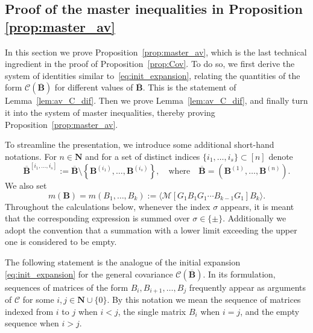 \documentclass[10pt]{amsart}
\numberwithin{equation}{section}
\newcommand{\N}{\mathbf{N}}
\begin{document}
\subsection{Proof of the master inequalities in Proposition \ref{prop:master_av}}\label{subsec:master_proof}

In this section we prove Proposition~\ref{prop:master_av}, which is the last technical ingredient in the proof of Proposition~\ref{prop:Cov}. To do so, we first derive the system of identities similar to~\eqref{eq:init_expansion}, relating the quantities of the form $\mathcal{C}(\overline{\bm{B}})$ for different values of $\overline{\bm{B}}$. This is the statement of Lemma~\ref{lem:av_C_dif}. Then we prove Lemma~\ref{lem:av_C_dif}, and finally turn it into the system of master inequalities, thereby proving Proposition~\ref{prop:master_av}.

To streamline the presentation, we introduce some additional short-hand notations. For $n\in\N$ and for a set of distinct indices $\{i_1,\ldots,i_s\}\subset [n]$ denote
\begin{equation*}
\overline{\bm{B}}^{[i_1,\ldots,i_s]}:=\overline{\bm{B}}\setminus\left\lbrace\bm{B}^{(i_1)},\ldots,\bm{B}^{(i_s)}\right\rbrace,\quad\text{where}\quad \overline{\bm{B}}=(\bm{B}^{(1)},\ldots,\bm{B}^{(n)}).
\end{equation*}
We also set
\begin{equation*}
m(\bm{B})=m(B_1,\ldots,B_k):=\langle \mathcal{M}[G_1B_1G_1\cdots B_{k-1}G_1] B_k\rangle.
\end{equation*}
Throughout the calculations below, whenever the index $\sigma$ appears, it is meant that the corresponding expression is summed over $\sigma\in\{\pm\}$. Additionally we adopt the convention that a summation with a lower limit exceeding the upper one is considered to be empty.

The following statement is the analogue of the initial expansion \eqref{eq:init_expansion} for the general covariance $\mathcal{C}(\overline{\bm{B}})$. In its formulation, sequences of matrices of the form $B_i, B_{i+1}, \ldots, B_j$ frequently appear as arguments of $\mathcal{C}$ for some $i,j\in\N\cup\{0\}$. By this notation we mean the sequence of matrices indexed from $i$ to $j$ when $i<j$, the single matrix $B_i$ when $i=j$, and the empty sequence when $i>j$. 
\end{document}
